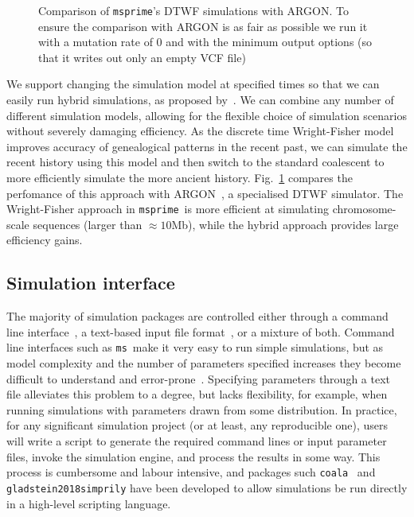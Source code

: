 \documentclass{article}
\newcommand{\msprime}[0]{\texttt{msprime}}
\newcommand{\ms}[0]{\texttt{ms}}
\begin{document}
\begin{figure}
\begin{center}
\end{center}
\caption{\label{fig-dtwf-perf} Comparison of \msprime's DTWF
simulations with ARGON. To ensure the comparison with ARGON is
as fair as possible we run it with a mutation rate of 0 and with
the minimum output options (so that it writes out only an empty VCF file)}
\end{figure}

We support changing the simulation model at specified times so that we can
easily run hybrid simulations, as proposed by~\cite{bhaskar2014distortion}. We
can combine any number of different simulation models, allowing for the
flexible choice of simulation scenarios without severely damaging efficiency.
As the discrete time Wright-Fisher model improves accuracy of genealogical
patterns in the recent past, we can simulate the recent history using this
model and then switch to the standard coalescent to more efficiently simulate
the more ancient history. Fig.~\ref{fig-dtwf-perf} compares the perfomance of
this approach with ARGON~\citep{palamara2016argon}, a specialised DTWF
simulator.  The Wright-Fisher approach in \msprime\ is more efficient at
simulating chromosome-scale sequences (larger than $\approx10$Mb), while the
hybrid approach provides large efficiency gains.


\subsection*{Simulation interface}

The majority of simulation packages are controlled either through
a command line interface~\citep[e.g.][]{hudson2002generating,kern2016discoal},
a text-based input file
format~\citep[e.g.][]{guillaume2006nemo,excoffier2011fastsimcoal,shlyakhter2014cosi2},
or a mixture of both.
Command line interfaces such as \ms\ make it very easy to run simple
simulations, but as model complexity and the number of parameters specified increases
they become difficult to understand and
error-prone~\citep{ragsdale2020lessons,gower2021demes}.
Specifying parameters through a text file alleviates this problem to a degree,
but lacks flexibility, for example, when running simulations with parameters
drawn from some distribution. In practice, for any significant simulation
project (or at least, any reproducible one), users will write a script
to generate the required command lines or input parameter files,
invoke the simulation engine, and process the results in some way.
This process is cumbersome and labour intensive, and packages
such \texttt{coala}~\citep{staab2016coala} and \texttt{gladstein2018simprily} have been developed
to allow simulations be run directly in a high-level
scripting language.
\end{document}
